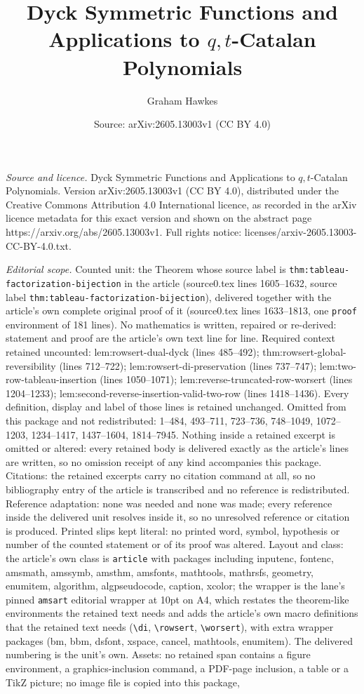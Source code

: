 \documentclass[10pt,a4paper]{amsart}
\title[Dyck Symmetric Functions and Applications to \(q,t\)-Catalan]{Dyck Symmetric Functions and Applications to \(q,t\)-Catalan Polynomials}
\author{Graham Hawkes}
\date{Source: arXiv:2605.13003v1 (CC BY 4.0)}
\begin{document}
\maketitle

\noindent\emph{Source and licence.} Dyck Symmetric Functions and Applications to \(q,t\)-Catalan Polynomials. Version arXiv:2605.13003v1 (CC BY 4.0), distributed under the Creative Commons Attribution 4.0 International licence, as recorded in the arXiv licence metadata for this exact version and shown on the abstract page https://arxiv.org/abs/2605.13003v1. Full rights notice: licenses/arxiv-2605.13003-CC-BY-4.0.txt.\par\smallskip

\noindent\textit{Editorial scope.} Counted unit: the Theorem whose source label is \texttt{thm:tableau-factorization-bijection} in the article (source0.tex lines 1605--1632, source label \texttt{thm:tableau-factorization-bijection}), delivered together with the article's own complete original proof of it (source0.tex lines 1633--1813, one \texttt{proof} environment of 181 lines). No mathematics is written, repaired or re-derived: statement and proof are the article's own text line for line. Required context retained uncounted: lem:rowsert-dual-dyck (lines 485--492); thm:rowsert-global-reversibility (lines 712--722); lem:rowsert-di-preservation (lines 737--747); lem:two-row-tableau-insertion (lines 1050--1071); lem:reverse-truncated-row-worsert (lines 1204--1233); lem:second-reverse-insertion-valid-two-row (lines 1418--1436). Every definition, display and label of those lines is retained unchanged. Omitted from this package and not redistributed: 1--484, 493--711, 723--736, 748--1049, 1072--1203, 1234--1417, 1437--1604, 1814--7945. Nothing inside a retained excerpt is omitted or altered: every retained body is delivered exactly as the article's lines are written, so no omission receipt of any kind accompanies this package. Citations: the retained excerpts carry no citation command at all, so no bibliography entry of the article is transcribed and no reference is redistributed. Reference adaptation: none was needed and none was made; every reference inside the delivered unit resolves inside it, so no unresolved reference or citation is produced. Printed slips kept literal: no printed word, symbol, hypothesis or number of the counted statement or of its proof was altered. Layout and class: the article's own class is \texttt{article} with packages including inputenc, fontenc, amsmath, amssymb, amsthm, amsfonts, mathtools, mathrsfs, geometry, enumitem, algorithm, algpseudocode, caption, xcolor; the wrapper is the lane's pinned \texttt{amsart} editorial wrapper at 10pt on A4, which restates the theorem-like environments the retained text needs and adds the article's own macro definitions that the retained text needs (\texttt{\textbackslash di}, \texttt{\textbackslash rowsert}, \texttt{\textbackslash worsert}), with extra wrapper packages (bm, bbm, dsfont, xspace, cancel, mathtools, enumitem). The delivered numbering is the unit's own. Assets: no retained span contains a figure environment, a graphics-inclusion command, a PDF-page inclusion, a table or a TikZ picture; no image file is copied into this package, 
\end{document}

